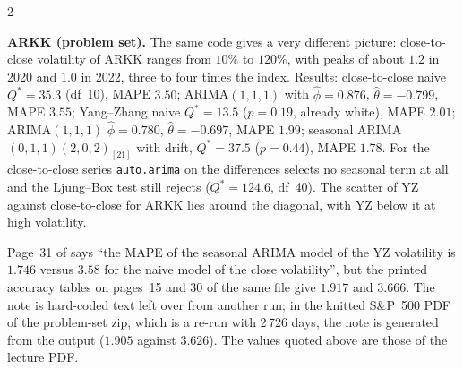 \begin{paracol}{2}
\begin{secondary}
\textbf{ARKK (problem set).} The same code gives a very different picture: close-to-close volatility of ARKK ranges from $10\%$ to $120\%$, with peaks of
about $1.2$ in 2020 and $1.0$ in 2022, three to four times the index. Results: close-to-close naive $Q^*=35.3$ (df~10), MAPE $3.50$; ARIMA$(1,1,1)$ with
$\hat\phi=0.876$, $\hat\theta=-0.799$, MAPE $3.55$; Yang--Zhang naive $Q^*=13.5$ ($p=0.19$, already white), MAPE $2.01$; ARIMA$(1,1,1)$
$\hat\phi=0.780$, $\hat\theta=-0.697$, MAPE $1.99$; seasonal ARIMA$(0,1,1)(2,0,2)_{[21]}$ with drift, $Q^*=37.5$ ($p=0.44$), MAPE $1.78$. For the
close-to-close series \texttt{auto.arima} on the differences selects no seasonal term at all and the Ljung--Box test still rejects
($Q^*=124.6$, df~40).
The scatter of YZ against close-to-close for ARKK lies around the diagonal, with YZ below it at high volatility.
\end{secondary}

\begin{coursenote}\label{ch13:cn-mape}
Page~31 of  says ``the MAPE of the seasonal ARIMA model of the YZ volatility is $1.746$ versus $3.58$ for the naive
model of the close volatility'', but the printed accuracy tables on pages~15 and 30 of the same file give $1.917$ and $3.666$. The note is
hard-coded text left over from another run; in the knitted S\&P~500 PDF of the problem-set zip, which is a re-run with 2\,726 days, the note is
generated from the output ($1.905$ against $3.626$). The values quoted above are those of the lecture PDF.
\end{coursenote}


\end{paracol}
